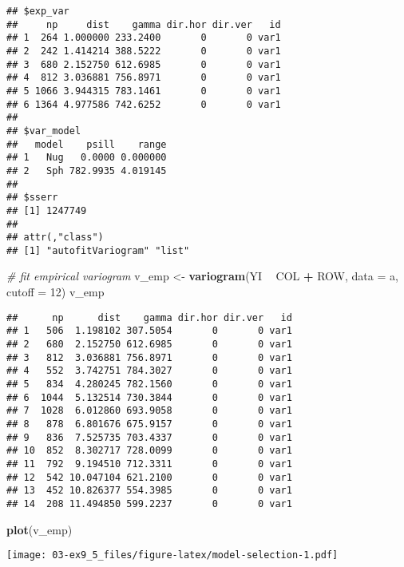 \documentclass[]{book}
\newenvironment{Shaded}{\begin{snugshade}}{\end{snugshade}}
\newcommand{\CommentTok}[1]{\textcolor[rgb]{0.56,0.35,0.01}{\textit{#1}}}
\newcommand{\DataTypeTok}[1]{\textcolor[rgb]{0.13,0.29,0.53}{#1}}
\newcommand{\DecValTok}[1]{\textcolor[rgb]{0.00,0.00,0.81}{#1}}
\newcommand{\KeywordTok}[1]{\textcolor[rgb]{0.13,0.29,0.53}{\textbf{#1}}}
\newcommand{\NormalTok}[1]{#1}
\newcommand{\OperatorTok}[1]{\textcolor[rgb]{0.81,0.36,0.00}{\textbf{#1}}}
\newcommand{\StringTok}[1]{\textcolor[rgb]{0.31,0.60,0.02}{#1}}
\begin{document}
\begin{verbatim}
## $exp_var
##     np     dist    gamma dir.hor dir.ver   id
## 1  264 1.000000 233.2400       0       0 var1
## 2  242 1.414214 388.5222       0       0 var1
## 3  680 2.152750 612.6985       0       0 var1
## 4  812 3.036881 756.8971       0       0 var1
## 5 1066 3.944315 783.1461       0       0 var1
## 6 1364 4.977586 742.6252       0       0 var1
## 
## $var_model
##   model    psill    range
## 1   Nug   0.0000 0.000000
## 2   Sph 782.9935 4.019145
## 
## $sserr
## [1] 1247749
## 
## attr(,"class")
## [1] "autofitVariogram" "list"
\end{verbatim}

\begin{Shaded}
\begin{Highlighting}[]
\CommentTok{# fit empirical variogram}
\NormalTok{v_emp <-}\StringTok{ }\KeywordTok{variogram}\NormalTok{(YI }\OperatorTok{~}\StringTok{ }\NormalTok{COL }\OperatorTok{+}\StringTok{ }\NormalTok{ROW, }\DataTypeTok{data =}\NormalTok{ a, }\DataTypeTok{cutoff =} \DecValTok{12}\NormalTok{)}
\NormalTok{v_emp}
\end{Highlighting}
\end{Shaded}

\begin{verbatim}
##      np      dist    gamma dir.hor dir.ver   id
## 1   506  1.198102 307.5054       0       0 var1
## 2   680  2.152750 612.6985       0       0 var1
## 3   812  3.036881 756.8971       0       0 var1
## 4   552  3.742751 784.3027       0       0 var1
## 5   834  4.280245 782.1560       0       0 var1
## 6  1044  5.132514 730.3844       0       0 var1
## 7  1028  6.012860 693.9058       0       0 var1
## 8   878  6.801676 675.9157       0       0 var1
## 9   836  7.525735 703.4337       0       0 var1
## 10  852  8.302717 728.0099       0       0 var1
## 11  792  9.194510 712.3311       0       0 var1
## 12  542 10.047104 621.2100       0       0 var1
## 13  452 10.826377 554.3985       0       0 var1
## 14  208 11.494850 599.2237       0       0 var1
\end{verbatim}

\begin{Shaded}
\begin{Highlighting}[]
\KeywordTok{plot}\NormalTok{(v_emp)}
\end{Highlighting}
\end{Shaded}

\texttt{[image: 03-ex9\_5\_files/figure-latex/model-selection-1.pdf]}
\end{document}
